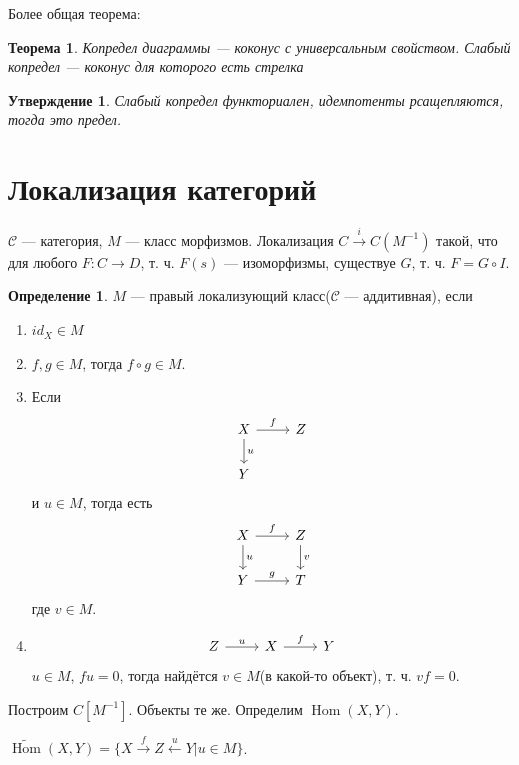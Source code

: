 \documentclass{article}
\newtheorem*{theorem}{Теорема}
\newtheorem*{statement}{Утверждение}
\theoremstyle{definition}
\newtheorem*{definition}{Определение}
\theoremstyle{remark}
\DeclareMathOperator{\Hom}{Hom}
\newcommand{\Cat}{\mathcal{C}}
\newenvironment{enum}[2][\parindent]{\begin{enumerate}[nosep, wide, labelindent = #1, label=#2]}{\end{enumerate}}
\newenvironment{cd}{\begin{equation*}\begin{tikzcd}}{\end{tikzcd}\end{equation*}}
\begin{document}
Более общая теорема:

\begin{theorem}
    Копредел диаграммы --- коконус с универсальным свойством. Слабый копредел --- коконус для которого есть стрелка
\end{theorem}

\begin{statement}
Слабый копредел функториален, идемпотенты рсащепляются, тогда это предел.
\end{statement}

\section{Локализация категорий}

$\Cat$ --- категория, $M$ --- класс морфизмов. Локализация $C \xrightarrow{i} C(M^{-1})$ такой, что для любого $F: C \rightarrow D$, т. ч. $F(s)$  --- изоморфизмы, существуе $G$, т. ч. $F = G \circ I$.

\begin{definition}
    $M$ --- правый локализующий класс($\Cat$ --- аддитивная), если
    \begin{enum}{\arabic*)}
        \item $id_X \in M$
        \item $f, g \in M$, тогда $f \circ g \in M$.
        \item Если 
        \begin{cd}
        X \dar["u"] \rar["f"] & Z \\
        Y
        \end{cd}
        и $u \in M$, тогда есть 
        \begin{cd}
        X \dar["u"] \rar["f"] & Z \dar["v"] \\
        Y \rar["g"] & T
        \end{cd}
        где $v \in M$.
        \item 
        \begin{cd}
            Z \rar["u"] & X \rar["f"] & Y
        \end{cd}
        $u \in M$, $fu = 0$, тогда найдётся $v \in M$(в какой-то объект), т. ч. $vf = 0$.
    \end{enum}
\end{definition}

Построим $C[M^{-1}]$. Объекты те же. Определим $\Hom(X, Y)$.

$\tilde{\Hom}(X, Y) = \{X \xrightarrow{f} Z \xleftarrow{u} Y| u \in M\}$.
\end{document}
